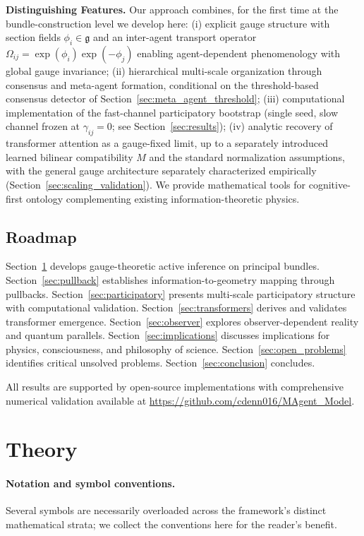 \documentclass[11pt]{article}
\begin{document}
\textbf{Distinguishing Features.} Our approach combines, for the first time at the bundle-construction level we develop here: (i) explicit gauge structure with section fields $\phi_i \in \mathfrak{g}$ and an inter-agent transport operator $\Omega_{ij} = \exp(\phi_i)\exp(-\phi_j)$ enabling agent-dependent phenomenology with global gauge invariance; (ii) hierarchical multi-scale organization through consensus and meta-agent formation, conditional on the threshold-based consensus detector of Section~\ref{sec:meta_agent_threshold}; (iii) computational implementation of the fast-channel participatory bootstrap (single seed, slow channel frozen at $\gamma_{ij} = 0$; see Section~\ref{sec:results}); (iv) analytic recovery of transformer attention as a gauge-fixed limit, up to a separately introduced learned bilinear compatibility $M$ and the standard normalization assumptions, with the general gauge architecture separately characterized empirically (Section~\ref{sec:scaling_validation}). We provide mathematical tools for cognitive-first ontology complementing existing information-theoretic physics.

\subsection{Roadmap}

Section~\ref{sec:framework} develops gauge-theoretic active inference on principal bundles. Section~\ref{sec:pullback} establishes information-to-geometry mapping through pullbacks. Section~\ref{sec:participatory} presents multi-scale participatory structure with computational validation. Section~\ref{sec:transformers} derives and validates transformer emergence. Section~\ref{sec:observer} explores observer-dependent reality and quantum parallels. Section~\ref{sec:implications} discusses implications for physics, consciousness, and philosophy of science. Section~\ref{sec:open_problems} identifies critical unsolved problems. Section~\ref{sec:conclusion} concludes.

All results are supported by open-source implementations with comprehensive numerical validation available at \url{https://github.com/cdenn016/MAgent_Model}.

\section{Theory}
\label{sec:framework}

\paragraph{Notation and symbol conventions.}
Several symbols are necessarily overloaded across the framework's distinct mathematical strata; we collect the conventions here for the reader's benefit.
\end{document}
